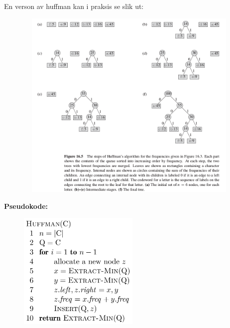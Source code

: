 \documentclass[12pt]{report}
\begin{document}
\setlength{\parskip}{10.56pt}
En verson av huffman kan i praksis se slik ut:\par


\vspace{\baselineskip}
\begin{multicols}{2}



\begin{figure}[H]		\includegraphics[width=4.4in,height=3.63in]{./media/image62.png}
\end{figure}



{\fontsize{13pt}{15.6pt}\selectfont \textbf{\textcolor[HTML]{353535}{Pseudokode:}}\par}\par




\begin{figure}[H]
	\begin{Center}
		\includegraphics[width=2.27in,height=2.22in]{./media/image63.png}
	\end{Center}
\end{figure}



\end{multicols}
\end{document}
